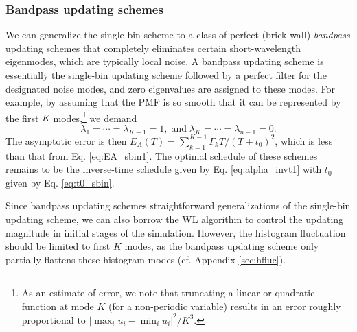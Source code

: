 \documentclass[reprint, superscriptaddress, floatfix]{revtex4-1}
\newcommand{\Err}{E}
\begin{document}
\subsubsection{\label{sec:bandpass}
Bandpass updating schemes}


We can generalize
the single-bin scheme to a class of
perfect (brick-wall) \emph{bandpass} updating schemes
that completely eliminates certain short-wavelength eigenmodes,
which are typically local noise.
%
A bandpass updating scheme is essentially
the single-bin updating scheme
followed by a perfect filter
for the designated noise modes,
and zero eigenvalues are assigned to these modes.
%
For example,
by assuming
that the PMF is so smooth
that it can be represented by the first $K$
modes,\footnote{As an estimate of error,
  we note that truncating a linear or quadratic function
  at mode $K$ (for a non-periodic variable)
  results in an error roughly proportional to
  $|\max_i u_i - \min_i u_i|^2/K^3$.}
we demand
%
\begin{equation}
  \lambda_1 = \cdots = \lambda_{K-1} = 1,
  \mathrm{\; and \;}
  \lambda_K = \cdots = \lambda_{n-1} = 0.
  \label{eq:lambda_bandpass}
\end{equation}
%
The asymptotic error is then
$\Err_A(T) = \sum_{ k = 1 }^{ K - 1 } \Gamma_k T/(T + t_0)^2$,
which is less than that from Eq. \eqref{eq:EA_sbin1}.
%
The optimal schedule of these schemes
remains to be the inverse-time schedule
given by Eq. \eqref{eq:alpha_invt1}
with $t_0$ given by Eq. \eqref{eq:t0_sbin}.
%
%

Since bandpass updating schemes
straightforward generalizations of
the single-bin updating scheme,
we can also borrow the WL algorithm
to control the updating magnitude
in initial stages of the simulation.
%
However, the histogram fluctuation should
be limited to first $K$ modes,
as the bandpass updating scheme
only partially flattens these histogram
modes (cf. Appendix \ref{sec:hfluc}).
\end{document}
